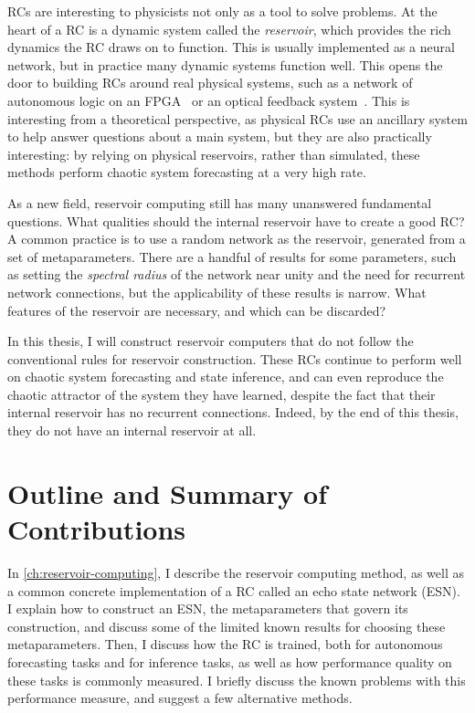 RCs are interesting to physicists not only as a tool to solve
problems. At the heart of a RC is a dynamic system called the
\emph{reservoir}, which provides the rich dynamics the RC draws on to
function. This is usually implemented as a neural network, but in
practice many dynamic systems function well. This opens the door to
building RCs around real physical systems, such as a network of
autonomous logic on an FPGA~\cite{canaday2018} or an optical feedback
system~\cite{antonik2016}. This is interesting from a theoretical
perspective, as physical RCs use an ancillary system to help answer
questions about a main system, but they are also practically
interesting: by relying on physical reservoirs, rather than simulated,
these methods perform chaotic system forecasting at a very high rate.

As a new field, reservoir computing still has many unanswered
fundamental questions. What qualities should the internal reservoir
have to create a good RC? A common practice is to use a random network
as the reservoir, generated from a set of metaparameters. There are a
handful of results for some parameters, such as setting the
\emph{spectral radius} of the network near unity and the need for
recurrent network connections,\cite{jaeger2001,lukosevicius2012} but
the applicability of these results is narrow. What features of the
reservoir are necessary, and which can be discarded?

In this thesis, I will construct reservoir computers that do not
follow the conventional rules for reservoir construction. These RCs
continue to perform well on chaotic system forecasting and state
inference, and can even reproduce the chaotic attractor of the system
they have learned, despite the fact that their internal reservoir has
no recurrent connections. Indeed, by the end of this thesis, they do
not have an internal reservoir at all.

\section{Outline and Summary of Contributions}


In \cref{ch:reservoir-computing}, I describe the reservoir computing
method, as well as a common concrete implementation of a RC called an
echo state network (ESN). I explain how to construct an ESN, the
metaparameters that govern its construction, and discuss some of the
limited known results for choosing these metaparameters. Then, I
discuss how the RC is trained, both for autonomous forecasting tasks
and for inference tasks, as well as how performance quality on these
tasks is commonly measured. I briefly discuss the known problems with
this performance measure, and suggest a few alternative methods.

